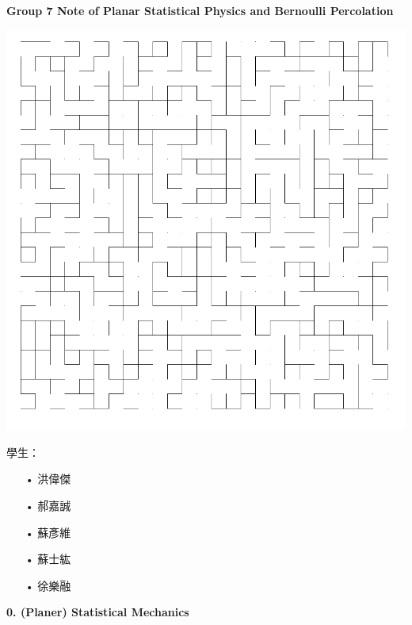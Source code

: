\documentclass[12pt,a4paper]{article}
\begin{document}
\begin{center}
\Huge    \textbf{Group 7 Note of Planar Statistical Physics and Bernoulli Percolation}
\end{center}
\begin{center}
\includegraphics[width=15cm]{./picture/new.jpg}
\end{center}
\vspace{2cm}
\begin{flushleft}
    \begin{CJK}{UTF8}{bkai}
    學生：
    \begin{enumerate}
        \item[•] 洪偉傑
        \item[•] 郝嘉誠
        \item[•] 蘇彥維
        \item[•] 蘇士紘
        \item[•] 徐樂融
    \end{enumerate}
    \end{CJK}
\end{flushleft}
\newpage
\begin{flushleft}
    \vspace*{5cm}
    \Huge \textbf{0. (Planer) Statistical Mechanics}
    \vspace*{3cm}
\end{flushleft}
\end{document}
